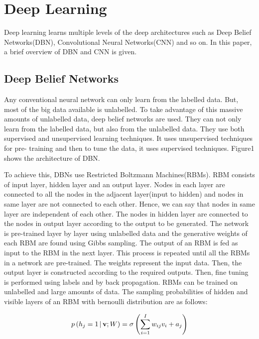 \documentclass[sigconf]{acmart}
\begin{document}
\section{Deep Learning}
Deep learning learns multiple levels of the deep architectures such as Deep Belief Networks(DBN), Convolutional Neural Networks(CNN) and so on. In this paper, a brief overview of DBN and CNN is given.

\subsection{Deep Belief Networks}
Any conventional neural network can only learn from the labelled data. But, most of the big data available is unlabelled. To take advantage of this massive amounts of unlabelled data, deep belief networks are used. They can not only learn from the labelled data, but also from the unlabelled data. They use both supervised and unsupervised learning techniques. It uses unsupervised techniques for pre- training and then to tune the data, it uses supervised techniques. Figure1 shows the architecture of DBN.



To achieve this, DBNs use Restricted Boltzmann Machines(RBMs). RBM consists of input layer, hidden layer and an output layer. Nodes in each layer are connected to all the nodes in the adjacent layer(input to hidden) and nodes in same layer are not connected to each other. Hence, we can say that nodes in same layer are independent of each other. The nodes in hidden layer are connected to the nodes in output layer according to the output to be generated. The network is pre-trained layer by layer using unlabelled data and the generative weights of each RBM are found using Gibbs sampling\cite{Hinton2006}. The output of an RBM is fed as input to the RBM in the next layer. This process is repeated until all the RBMs in a network are pre-trained. The weights represent the input data. Then, the output layer is constructed according to the required outputs. Then, fine tuning is performed using labels and by back propagation. RBMs can be trained on unlabelled and large amounts of data. The sampling probabilities of hidden and visible layers of an RBM with bernoulli distribution are as follows:

\begin{equation} p\left ( {h_{j}=1}\thinspace \vert \thinspace {\mathbf {v};W}\right ) =\sigma \left ( \sum \limits _{i=1}^I {w_{ij}v_{i}+a_{j}} \right )\end{equation}
\end{document}
